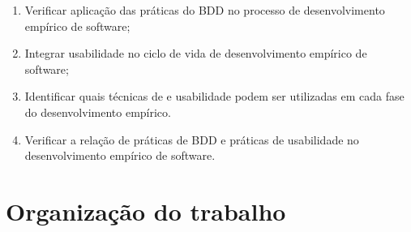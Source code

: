\begin{enumerate}
\item Verificar aplicação das práticas do BDD no processo de desenvolvimento empírico de software;
\item Integrar usabilidade no ciclo de vida de desenvolvimento empírico de software;
\item Identificar quais técnicas de e usabilidade  podem ser utilizadas em cada fase do desenvolvimento empírico.
\item Verificar a relação de práticas de BDD e práticas de usabilidade no desenvolvimento empírico de software.
\end{enumerate}


\begin{comment}
	\section{Metodologia}



	\subsection{Classificação da Pesquisa}

		Neste trabalho, a coleta e análise dos dados serão realizadas com base em  materiais já publicados, constituído principalmente de livros, artigos de periódicos e  materiais disponibilizados na Internet, caracterizando-se, portanto, como uma pesquisa bibliográfica do ponto de vista do procedimento técnico empregado~\cite{gil1991}.


	\subsection{Estudo de Caso}

		Utilizamos um estudo de caso para desenvolvimento do trabalho, dividido em definição, planejamento, coleta de dados, análise dos dados e interpretação dos resultados.
\end{comment}

\section{Organização do trabalho}



